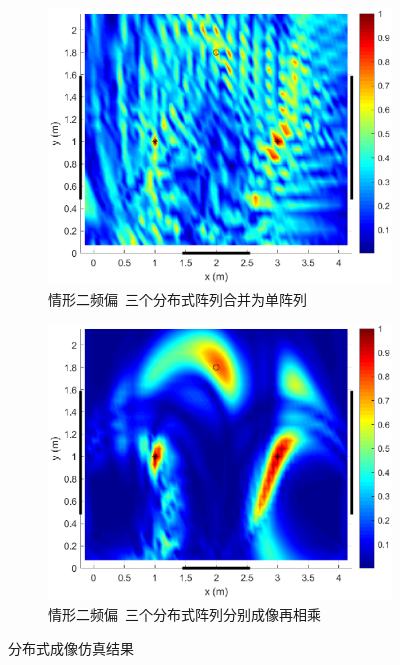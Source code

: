 \begin{figure}[H]
\begin{subfigure}[t]{.3\linewidth}
    \centering
    \includegraphics[width=1\textwidth]{figures/distribution/freq/joint.eps}
    \caption{情形二频偏~三个分布式阵列合并为单阵列}
  \end{subfigure}
  \begin{subfigure}[t]{.3\linewidth}
    \centering
    \includegraphics[width=1\textwidth]{figures/distribution/freq/multiplication.eps}
    \caption{情形二频偏~三个分布式阵列分别成像再相乘}
  \end{subfigure}
  \caption{分布式成像仿真结果}\label{分布式成像仿真结果}
\end{figure}

